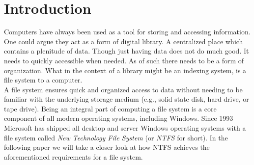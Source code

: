 \section{Introduction}
Computers have always been used as a tool for storing and accessing information. One could argue they act as a form of digital library. A centralized place which contains a plenitude of data.
Though just having data does not do much good. It needs to quickly accessible when needed. As of such there  needs to be a form of organization. What in the context of a library might be an indexing system, is a file system to a computer.\\
A file system ensures quick and organized access to data without needing to be familiar with the underlying storage medium (e.g., solid state disk, hard drive, or tape drive).
Being an integral part of computing a file system is a core component of all modern operating systems, including Windows. Since 1993\cite{Custer:1994:IWN} Microsoft has shipped all desktop and server Windows operating systems with a file system called \textit{New Technology File System} (or \textit{NTFS} for short). In the following paper we will take a closer look at how NTFS achieves the aforementioned requirements for a file system.